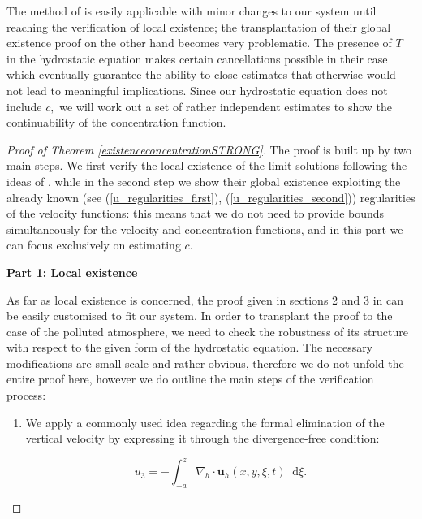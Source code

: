 \documentclass[11pt, a4paper]{article}
\newcommand*\diff{\mathop{}\!\mathrm{d}}
\begin{document}
The method of \cite{cao2014local} is easily applicable with minor changes to our system until reaching the verification of local existence; the transplantation of their global existence proof on the other hand becomes very problematic. The presence of $T$ in the hydrostatic equation makes certain cancellations possible in their case which eventually guarantee the ability to close estimates that otherwise would not lead to meaningful implications. Since our hydrostatic equation does not include $c,$ we will work out a set of rather independent estimates to show the continuability of the concentration function.

\begin{proof}[Proof of Theorem \ref{existenceconcentrationSTRONG}]

The proof is built up by two main steps. We first verify the local existence of the limit solutions following the ideas of \cite{cao2014local}, while in the second step we show their global existence exploiting the already known (see (\ref{u_regularities_first}), (\ref{u_regularities_second})) regularities of the velocity functions: this means that we do not need to provide bounds simultaneously for the velocity and concentration functions, and in this part we can focus exclusively on estimating $c.$

\bigskip

\textbf{Part 1: Local existence}

As far as local existence is concerned, the proof given in sections 2 and 3 in \cite{cao2014local} can be easily customised to fit our system. In order to transplant the proof to the case of the polluted atmosphere, we need to check the robustness of its structure with respect to the given form of the hydrostatic equation. The necessary modifications are small-scale and rather obvious, therefore we do not unfold the entire proof here, however we do outline the main steps of the verification process:

\begin{enumerate}

\item We apply a commonly used idea regarding the formal elimination of the vertical velocity by expressing it through the divergence-free condition:

\begin{equation} \label{u_3_expressed_div_free}
u_3 = - \int_{-a}^z \nabla_h \cdot \mathbf{u}_h (x, y, \xi, t) \diff \xi.
\end{equation}


\end{enumerate}
\end{proof}
\end{document}
